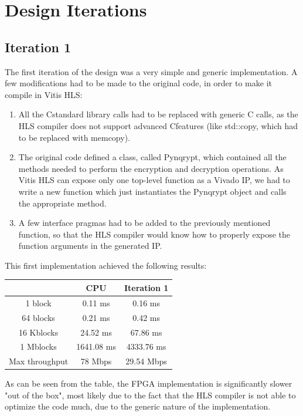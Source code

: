 \documentclass[12pt,oneside,a4paper]{article}
\def\CC{{C\nolinebreak[4]\hspace{-.05em}\raisebox{.4ex}{\tiny\bf ++}}}
\begin{document}
\section{Design Iterations} \label{sec:iterations}

\subsection{Iteration 1} \label{subsec:iter1}
The first iteration of the design was a very simple and generic implementation. A few modifications had to be made to the original code, in order to make it compile in Vitis HLS:
\begin{enumerate}
	\item All the \CC standard library calls had to be replaced with generic C calls, as the HLS compiler does not support advanced \CC features (like std::copy, which had to be replaced with memcopy).
	\item The original code defined a class, called Pynqrypt, which contained all the methods needed to perform the encryption and decryption operations. As Vitis HLS can expose only one top-level function as a Vivado IP, we had to write a new function which just instantiates the Pynqrypt object and calls the appropriate method.
	\item A few interface pragmas had to be added to the previously mentioned function, so that the HLS compiler would know how to properly expose the function arguments in the generated IP.
\end{enumerate}

This first implementation achieved the following results:
\begin{table}[h!]
	\centering
	\begin{tabular}{ccc}
		\toprule
		 & CPU & Iteration 1 \\
		\midrule
		1 block & 0.11 ms & 0.16 ms \\
		64 blocks & 0.21 ms & 0.42 ms \\
		16 Kblocks & 24.52 ms & 67.86 ms \\
		1 Mblocks & 1641.08 ms & 4333.76 ms \\
		Max throughput & 78 Mbps & 29.54 Mbps \\
		\bottomrule
	\end{tabular}
\end{table}

As can be seen from the table, the FPGA implementation is significantly slower "out of the box", most likely due to the fact that the HLS compiler is not able to optimize the code much, due to the generic nature of the implementation.  
\end{document}

